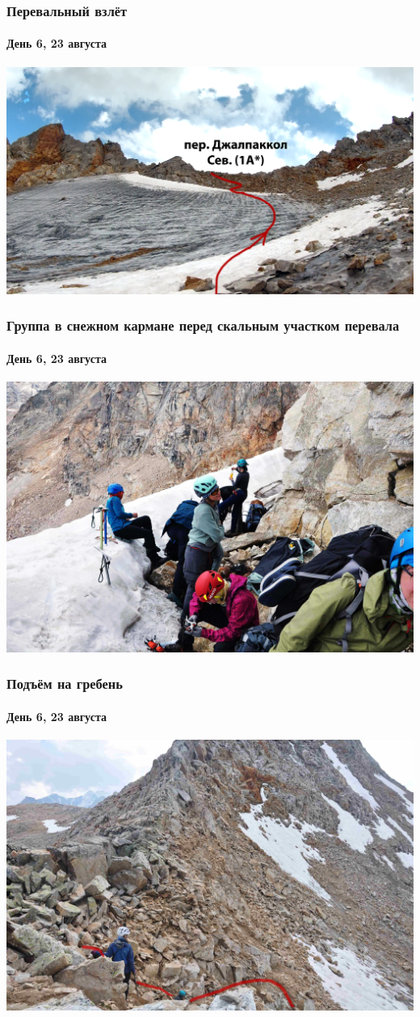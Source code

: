 \begin{frame}
	\frametitle{Перевальный взлёт}
	\framesubtitle{День 6, 23 августа}
	\centering
	\includegraphics[width=\textwidth]{../pics/dzh_1}			
\end{frame}



\begin{frame}
	\frametitle{Группа в снежном кармане перед скальным участком перевала}
	\framesubtitle{День 6, 23 августа}
	\centering
	\includegraphics[width=\textwidth]{../pics/DSC_0021}			
\end{frame}


\begin{frame}
	\frametitle{Подъём на гребень}
	\framesubtitle{День 6, 23 августа}
	\centering
	\includegraphics[width=\textwidth]{../pics/DSC_0029}			
\end{frame}


